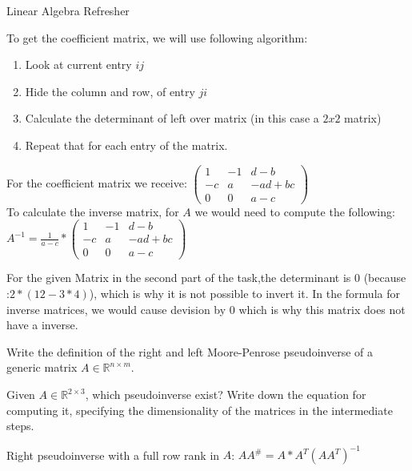 \documentclass[
	english,
        solution=true
	]{tudaexercise}
\newcommand{\R}{\mathbb{R}}
\begin{document}
\begin{task}[points=28]{Linear Algebra Refresher}
\begin{subtask}[points=7,title=Matrix Inversion]
\begin{solution}
To get the coefficient matrix, we will use following algorithm:
\begin{enumerate}
    \item Look at current entry $ij$
    \item Hide the column and row, of entry $ji$
    \item Calculate the determinant of left over matrix (in this case a $2x2$ matrix)
    \item Repeat that for each entry of the matrix.
\end{enumerate}
For the coefficient matrix we receive: $\begin{pmatrix}
    1 & -1 & d-b\\-c & a & -ad+bc \\ 0 & 0 & a-c
\end{pmatrix}$\\

To calculate the inverse matrix, for $A$ we would need to compute the following: $A^{-1}=\frac{1}{a-c}*\begin{pmatrix}
    1 & -1 & d-b\\-c & a & -ad+bc \\ 0 & 0 & a-c
\end{pmatrix}$

For the given Matrix in the second part of the task,the determinant is $0$ (because :$2*(12-3*4)$), which is why it is not possible to invert it. In the formula for inverse matrices, we would cause devision by $0$ which is why this matrix does not have a inverse.

\end{solution}
\end{subtask}


\begin{subtask}[points=3,title=Matrix Pseudoinverse]

Write the definition of the right and left Moore-Penrose pseudoinverse of a generic matrix $A \in \R^{n\times m}$.

Given $A \in \R^{2 \times 3}$, which pseudoinverse exist? Write down the equation for computing it, specifying the dimensionality of the matrices in the intermediate steps.

\begin{solution}

Right pseudoinverse with a full row rank in $A$: $AA^\#=A*A^T(AA^T)^{-1}$\\


\end{solution}
\end{subtask}
\end{task}
\end{document}
